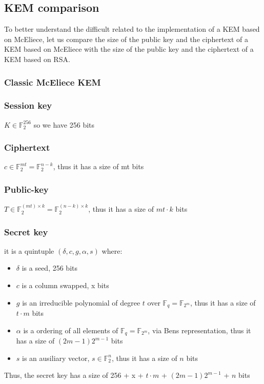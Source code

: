 \subsection{KEM comparison}
To better understand the difficult related to the implementation of a KEM based on McEliece, let us compare the size of the public key and the ciphertext of a KEM based on McEliece with the size of the public key and the ciphertext of a KEM based on RSA.

\subsubsection{Classic McEliece KEM}

\subsubsection*{Session key}
$K \in \mathbb{F}_2^{256}$ so we have 256 bits

\subsubsection*{Ciphertext}
$c \in \mathbb{F}_2^{mt} = \mathbb{F}_2^{n-k}$, thus it has a size of mt bits

\subsubsection*{Public-key}
$T \in \mathbb{F}_2^{(mt) \times k} = \mathbb{F}_2^{(n-k) \times k}$, thus it has a size of $mt \cdot k$ bits

\subsubsection*{Secret key}
it is a quintuple $(\delta, c, g, \alpha, s)$ where:
\begin{itemize}
    \item $\delta$ is a seed, 256 bits
    \item $c$ is a column swapped, x bits
    \item $g$ is an irreducible polynomial of degree $t$ over $\mathbb{F}_q = \mathbb{F}_{2^m}$, thus it has a size of $t \cdot m$ bits
    \item $\alpha$ is a ordering of all elements of $\mathbb{F}_q = \mathbb{F}_{2^m}$, via Bens representation, thus it has a size of $(2m-1)2^{m-1}$ bits
    \item $s$ is an ausiliary vector, $s \in \mathbb{F}_2^n$, thus it has a size of $n$ bits
\end{itemize}
Thus, the secret key has a size of 256 + x + $t \cdot m$ + $(2m-1)2^{m-1}$ + $n$ bits

